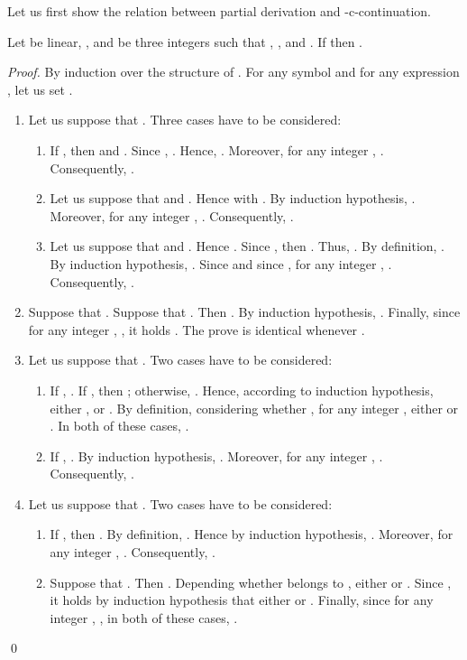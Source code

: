 \documentclass{llncs}
\begin{document}
Let us first show the relation between partial derivation and -c-continuation.

\begin{lemma}\label{lem f cgk cf}
Let  be linear,  ,  and  be three integers such that , ,  and  . If  then .
\end{lemma}
\begin{proof}
  By induction over the structure of . For any symbol  and for any expression , let us set 
  .
  \begin{enumerate}
    \item Let us suppose that . Three cases have to be considered:
    \begin{enumerate}
      \item If , then  and . Since , . Hence, . Moreover, for any integer , . Consequently, .
      \item Let us suppose that  and . Hence  with . By induction hypothesis, . Moreover, for any integer , . Consequently, .
      \item Let us suppose that  and . Hence . Since , then . Thus, . By definition, . By induction hypothesis, . Since  and since , for any integer , . Consequently, .
    \end{enumerate}
    \item Suppose that . Suppose that . Then . By induction hypothesis, . Finally, since for any integer , , it holds . The prove is identical whenever .
    \item Let us suppose that . Two cases have to be considered:
    \begin{enumerate}
      \item If , . If , then ; otherwise, . Hence, according to induction hypothesis, either , or . By definition, considering whether , for any integer , either  or . In both of these cases, .
      \item If , . By induction hypothesis, . Moreover, for any integer , . Consequently, .
    \end{enumerate} 
    \item Let us suppose that . Two cases have to be considered:
    \begin{enumerate}
      \item If , then . By definition, . Hence by induction hypothesis, .  Moreover, for any integer , . Consequently, .
      \item Suppose that . Then . Depending whether  belongs to , either   or .  Since , it holds by induction hypothesis that either   or . Finally, since  for any integer , , in both of these cases, .
    \end{enumerate}
  \end{enumerate}
 \qed
\end{proof}
\end{document}
